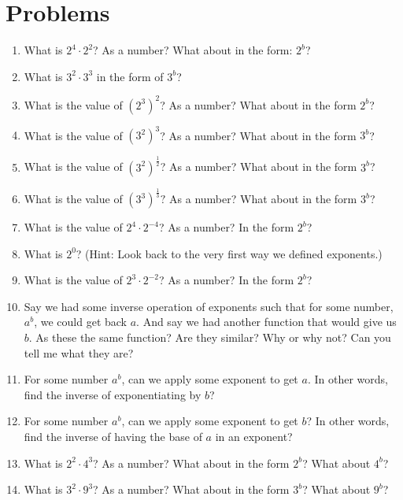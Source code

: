 \documentclass{article}
\begin{document}
\section*{Problems}
\begin{multicols*}{2}
\begin{enumerate}
    \item What is $2^4 \cdot 2^2$? As a number? What about in the form: $2^b$?
    \item What is $3^2 \cdot 3^3$ in the form of $3^b$? 
    \item What is the value of $\left(2^3\right)^2$? As a number? What about in the form $2^b$? 
    \item What is the value of $\left(3^2\right)^3$? As a number? What about in the form $3^b$? 
    \item What is the value of $\left(3^2\right)^{\frac{1}{2}}$? As a number? What about in the form $3^b$? 
    \item What is the value of $\left(3^3\right)^{\frac{1}{3}}?$ As a number? What about in the form $3^b$? 
    \item What is the value of $2^4 \cdot 2^{-4}$? As a number? In the form $2^b$? 
    \item What is $2^0$? (Hint: Look back to the very first way we defined exponents.)
    \item What is the value of $2^3 \cdot 2^{-2}$? As a number? In the form $2^b$? 
    \item Say we had some inverse operation of exponents such that for some number, $a^b$, we could get back $a$. And say we had another function that would give us $b$. As these the same function? Are they similar? Why or why not? Can you tell me what they are? 
    \item For some number $a^b$, can we apply some exponent to get $a$. In other words, find the inverse of exponentiating by $b$? 
    \item For some number $a^b$, can we apply some exponent to get $b$? In other words, find the inverse of having the base of $a$ in an exponent?
    \item What is $2^2 \cdot 4^3$? As a number? What about in the form $2^b$? What about $4^b$? 
    \item What is $3^2 \cdot 9^3$? As a number? What about in the form $3^b$? What about $9^b$?  
\end{enumerate}
\end{multicols*}
\end{document}
